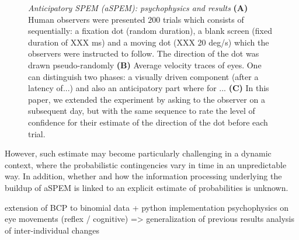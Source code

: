 \documentclass[profile,final,english, draft]{article}%
\begin{document}
\begin{figure}%
\caption{\emph{Anticipatory SPEM (aSPEM): psychophysics and results} %
\textbf{(A)} Human observers were presented $200$ trials which consists of sequentially: a fixation dot (random duration), a blank screen (fixed duration of XXX ms) and a moving dot (XXX 20 deg/s) which the observers were instructed to follow. The direction of the dot was drawn pseudo-randomly
\textbf{(B)} Average velocity traces of eyes. One can distinguish two phases: a visually driven component (after a latency of...) and also an anticipatory part where for ...
\textbf{(C)} In this paper, we extended the experiment by asking to the observer on a subsequent day, but with the same sequence to rate the level of confidence for their estimate of the direction of the dot before each trial.
 }
\label{fig:intro}
\end{figure}


However, such estimate may become particularly challenging in a dynamic context, where the probabilistic contingencies vary in time in an unpredictable way. In addition, whether and how the information processing underlying the buildup of aSPEM is linked to an explicit estimate of probabilities is unknown.


extension of BCP to binomial data + python implementation 
psychophysics on eye movements (reflex / cognitive) => generalization of previous results
analysis of inter-individual changes
\end{document}
